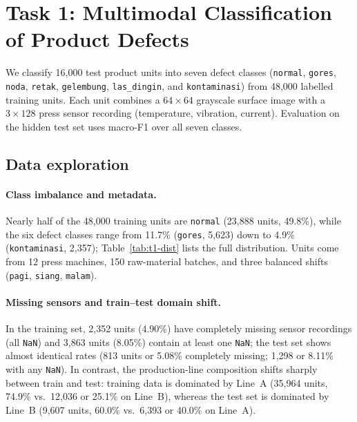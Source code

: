 \section{Task 1: Multimodal Classification of Product Defects}
\label{sec:t1}

We classify 16{,}000 test product units into seven defect classes (\texttt{normal}, \texttt{gores},
\texttt{noda}, \texttt{retak}, \texttt{gelembung}, \texttt{las\_dingin}, and \texttt{kontaminasi})
from 48{,}000 labelled training units. Each unit combines a $64 \times 64$ grayscale surface image
with a $3 \times 128$ press sensor recording (temperature, vibration, current). Evaluation on the
hidden test set uses macro-F1 over all seven classes.

\subsection{Data exploration}
\label{sec:t1-eda}

\paragraph{Class imbalance and metadata.} Nearly half of the 48{,}000 training units are
\texttt{normal} (23{,}888 units, 49.8\%), while the six defect classes range from 11.7\%
(\texttt{gores}, 5{,}623) down to 4.9\% (\texttt{kontaminasi}, 2{,}357); Table~\ref{tab:t1-dist}
lists the full distribution. Units come from 12 press machines, 150 raw-material batches, and three
balanced shifts (\texttt{pagi}, \texttt{siang}, \texttt{malam}).

\paragraph{Missing sensors and train--test domain shift.} In the training set, 2{,}352 units
(4.90\%) have completely missing sensor recordings (all \texttt{NaN}) and 3{,}863 units (8.05\%)
contain at least one \texttt{NaN}; the test set shows almost identical rates (813 units or 5.08\%
completely missing; 1{,}298 or 8.11\% with any \texttt{NaN}). In contrast, the production-line
composition shifts sharply between train and test: training data is dominated by Line~A
(35{,}964 units, 74.9\% vs.\ 12{,}036 or 25.1\% on Line~B), whereas the test set is dominated by
Line~B (9{,}607 units, 60.0\% vs.\ 6{,}393 or 40.0\% on Line~A).

